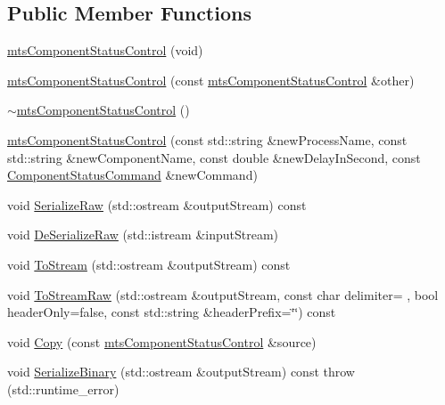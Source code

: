 \subsection*{Public Member Functions}
\begin{DoxyCompactItemize}
\item 
\hyperlink{classmts_component_status_control_a4a0eb4df876169e6dbdd0d822362d8fe}{mts\+Component\+Status\+Control} (void)
\item 
\hyperlink{classmts_component_status_control_a1b81428cfe551fc765f40b0081424f1a}{mts\+Component\+Status\+Control} (const \hyperlink{classmts_component_status_control}{mts\+Component\+Status\+Control} \&other)
\item 
\hyperlink{classmts_component_status_control_a326a6e23cf95c0be12787c2400fd63a8}{$\sim$mts\+Component\+Status\+Control} ()
\item 
\hyperlink{classmts_component_status_control_abae2a8ef219b86843c51a5420e12fe4b}{mts\+Component\+Status\+Control} (const std\+::string \&new\+Process\+Name, const std\+::string \&new\+Component\+Name, const double \&new\+Delay\+In\+Second, const \hyperlink{classmts_component_status_control_aaa1cc592d13ddd45a5cf695f72d3511f}{Component\+Status\+Command} \&new\+Command)
\item 
void \hyperlink{classmts_component_status_control_a08061e2b13e950ad1808c52ca9d2b6eb}{Serialize\+Raw} (std\+::ostream \&output\+Stream) const 
\item 
void \hyperlink{classmts_component_status_control_a6b3b0363d79317544aa2e24106b65c74}{De\+Serialize\+Raw} (std\+::istream \&input\+Stream)
\item 
void \hyperlink{classmts_component_status_control_a203ad251c8d802a2528587accdccd47b}{To\+Stream} (std\+::ostream \&output\+Stream) const 
\item 
void \hyperlink{classmts_component_status_control_a2aaf608f7b087a267a29930951bdd1e9}{To\+Stream\+Raw} (std\+::ostream \&output\+Stream, const char delimiter= \textquotesingle{} \textquotesingle{}, bool header\+Only=false, const std\+::string \&header\+Prefix=\char`\"{}\char`\"{}) const 
\item 
void \hyperlink{classmts_component_status_control_a4f0fff86345f1b1c83564a9de812d4d3}{Copy} (const \hyperlink{classmts_component_status_control}{mts\+Component\+Status\+Control} \&source)
\item 
void \hyperlink{classmts_component_status_control_ab583cb42c8fdaa82b88bb7e33dff8dd7}{Serialize\+Binary} (std\+::ostream \&output\+Stream) const   throw (std\+::runtime\+\_\+error)

\end{DoxyCompactItemize}
